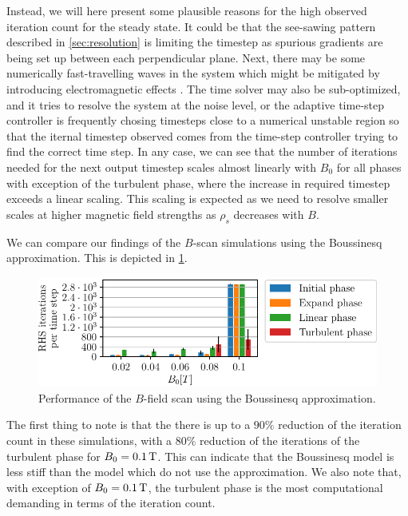 Instead, we will here present some plausible reasons for the high observed iteration count for the steady state.
It could be that the see-sawing pattern described in \cref{sec:resolution} is limiting the timestep as spurious gradients are being set up between each perpendicular plane.
Next, there may be some numerically fast-travelling waves in the system which might be mitigated by introducing electromagnetic effects \cite{Dudson2015Private}.
The time solver may also be sub-optimized, and it tries to resolve the system at the noise level, or the adaptive time-step controller is frequently chosing timesteps close to a numerical unstable region so that the iternal timestep observed comes from the time-step controller trying to find the correct time step.
In any case, we can see that the number of iterations needed for the next output timestep scales almost linearly with $B_0$ for all phases with exception of the turbulent phase, where the increase in required timestep exceeds a linear scaling.
This scaling is expected as we need to resolve smaller scales at higher magnetic field strengths as $\rho_s$ decreases with $B$.

We can compare our findings of the $B$-scan simulations using the Boussinesq approximation.
This is depicted in \cref{fig:BoussPerformance}.
%
\begin{figure}[htb]
    \centering
    \includegraphics{fig/results/performance/RHSEvalsPerTimeBoussinesqScan}
    \caption{Performance of the $B$-field scan using the Boussinesq approximation.}
    \label{fig:BoussPerformance}
\end{figure}
%
The first thing to note is that the there is up to a $90 \%$ reduction of the iteration count in these simulations, with a $80\%$ reduction of the iterations of the turbulent phase for $B_0=0.1\, \text{T}$.
This can indicate that the Boussinesq model is less stiff than the model which do not use the approximation.
We also note that, with exception of $B_0=0.1\, \text{T}$, the turbulent phase is the most computational demanding in terms of the iteration count.

